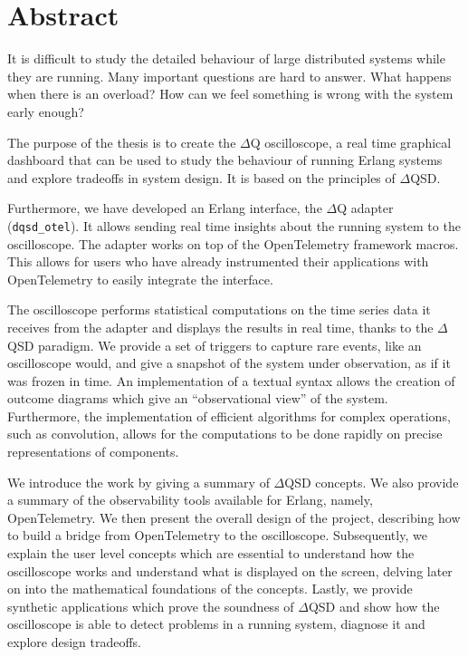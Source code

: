\chapter*{Abstract}
    It is difficult to study the detailed behaviour of large distributed systems while they are running. Many important questions are hard to answer. What happens when there is an overload? How can we feel something is wrong with the system early enough?

    The purpose of the thesis is to create the $\Delta$Q oscilloscope, a real time graphical dashboard that can be used to study the behaviour of running Erlang systems and explore tradeoffs in system design. It is based on the principles of $\Delta$QSD.
  
    Furthermore, we have developed an Erlang interface, the $\Delta$Q adapter (\texttt{dqsd\_otel}). It allows sending real time insights about the running system to the oscilloscope. The adapter works on top of the OpenTelemetry framework macros. This allows for users who have already instrumented their applications with OpenTelemetry to easily integrate the interface.

    The oscilloscope performs statistical computations on the time series data it receives from the adapter and displays the results in real time, thanks to the $\Delta$QSD paradigm. We provide a set of triggers to capture rare events, like an oscilloscope would, and give a snapshot of the system under observation, as if it was frozen in time. An implementation of a textual syntax allows the creation of outcome diagrams which give an ``observational view'' of the system. Furthermore, the implementation of efficient algorithms for complex operations, such as convolution, allows for the computations to be done rapidly on precise representations of components.

    We introduce the work by giving a summary of $\Delta$QSD concepts. We also provide a summary of the observability tools available for Erlang, namely, OpenTelemetry. We then present the overall design of the project, describing how to build a bridge from OpenTelemetry to the oscilloscope. Subsequently, we explain the user level concepts which are essential to understand how the oscilloscope works and understand what is displayed on the screen, delving later on into the mathematical foundations of the concepts. Lastly, we provide synthetic applications which prove the soundness of $\Delta$QSD and show how the oscilloscope is able to detect problems in a running system, diagnose it and explore design tradeoffs.



